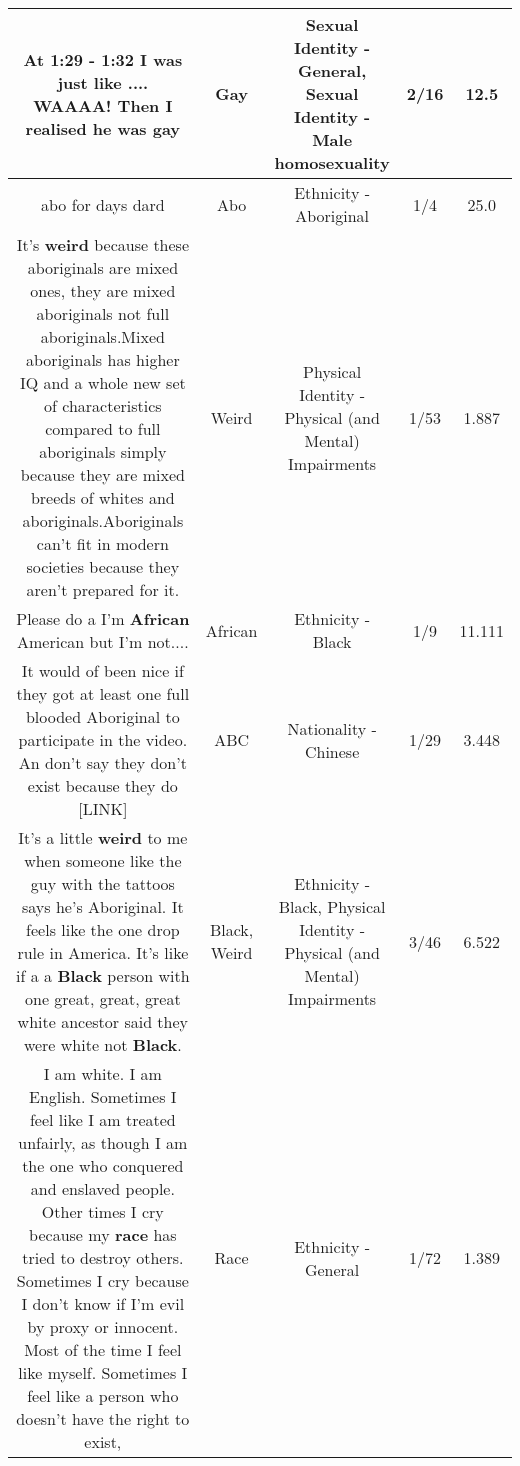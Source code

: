 \documentclass[11pt]{article}
\newlength\mylength
\begin{document}
\begin{center}
\begin{longtable}{|C{.65\mylength}|C{.30\mylength}|C{.12\mylength}|C{.12\mylength}|C{.12\mylength}|}
  \small At 1:29 - 1:32 I was just like .... WAAAA! Then I realised he was gay\normalsize   & Gay & Sexual Identity - General, Sexual Identity - Male homosexuality & 2/16 & 12.5 \\  \hline
  \small abo for days dard\normalsize   & Abo & Ethnicity - Aboriginal & 1/4 & 25.0 \\  \hline
  \small It's \textbf{weird} because these aboriginals are mixed ones, they are mixed aboriginals not full aboriginals.Mixed aboriginals has higher IQ and a whole new set of characteristics compared to full aboriginals simply because they are mixed breeds of whites and aboriginals.Aboriginals can't fit in modern societies because they aren't prepared for it.\normalsize   & Weird & Physical Identity - Physical (and Mental) Impairments & 1/53 & 1.887 \\  \hline
  \small Please do a I'm \textbf{African} American but I'm not....\normalsize   & African & Ethnicity - Black & 1/9 & 11.111 \\  \hline
  \small It would of been nice if they got at least one full blooded Aboriginal to participate in the video. An don't say they don't exist because they do  [LINK] \normalsize   & ABC & Nationality - Chinese & 1/29 & 3.448 \\  \hline
  \small It's a little \textbf{weird} to me when someone like the guy with the tattoos says he's Aboriginal. It feels like the one drop rule in America. It's like if a a \textbf{Black} person with one great, great, great white ancestor said they were white not \textbf{Black}.\normalsize   & Black, Weird & Ethnicity - Black, Physical Identity - Physical (and Mental) Impairments & 3/46 & 6.522 \\  \hline
  \small I am white. I am English. Sometimes I feel like I am treated unfairly, as though I am the one who conquered and enslaved people. Other times I cry because my \textbf{race} has tried to destroy others. Sometimes I cry because I don't know if I'm evil by proxy or innocent. Most of the time I feel like myself. Sometimes I feel like a person who doesn't have the right to exist,\normalsize   & Race & Ethnicity - General & 1/72 & 1.389 \\  \hline

\end{longtable}
\end{center}
\end{document}
